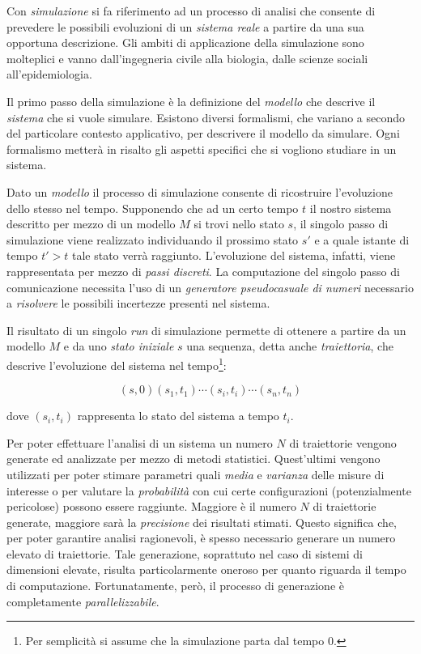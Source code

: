 
Con \emph{simulazione} si fa riferimento ad un processo di analisi che consente di prevedere le possibili evoluzioni di un \emph{sistema reale} a partire da una sua opportuna descrizione. 
%
Gli ambiti di applicazione della simulazione sono molteplici e vanno dall'ingegneria civile alla biologia, dalle scienze sociali all'epidemiologia.

Il primo passo della simulazione \`e la definizione del \emph{modello} che descrive il \emph{sistema} che si vuole simulare.
%
Esistono diversi formalismi, che variano a secondo del particolare contesto applicativo, per descrivere il modello da simulare.
%
Ogni formalismo metter\`a in risalto gli aspetti specifici che si vogliono studiare in un sistema. 

Dato un \emph{modello} il processo di simulazione consente di ricostruire l'evoluzione dello stesso nel tempo. 
%
Supponendo che ad un certo tempo $t$ il nostro sistema descritto per mezzo di un modello $M$ si trovi nello stato $s$, il singolo passo di simulazione viene realizzato individuando il prossimo stato $s'$ e a quale  istante di tempo $t'>t$ tale stato verr\`a raggiunto. 
%
L'evoluzione del sistema, infatti, viene rappresentata per mezzo di \emph{passi discreti}.
%
La computazione del singolo passo di comunicazione necessita l'uso di un \emph{generatore pseudocasuale di numeri} necessario a \emph{risolvere} le possibili incertezze presenti nel sistema.

Il risultato di un singolo \emph{run} di simulazione permette di ottenere a partire da un modello $M$ e da uno \emph{stato iniziale} $s$ una sequenza, detta anche \emph{traiettoria}, che descrive l'evoluzione del sistema nel tempo\footnote{Per semplicit\`a si assume che la simulazione parta dal tempo $0$.}:

\[
(s,0)(s_1,t_1)\cdots (s_i,t_i)\cdots (s_n,t_n)
\]  

\noindent
dove $(s_i,t_i)$ rappresenta lo stato del sistema a tempo $t_i$.

Per poter effettuare l'analisi di un sistema un numero $N$ di traiettorie vengono generate ed analizzate per mezzo di metodi statistici. Quest'ultimi vengono utilizzati per poter stimare parametri quali \emph{media} e \emph{varianza} delle misure di interesse o per valutare la \emph{probabilit\`a} con cui certe configurazioni (potenzialmente pericolose) possono essere raggiunte.
%
Maggiore \`e il numero $N$ di traiettorie generate, maggiore sar\`a la \emph{precisione} dei risultati stimati. 
%
Questo significa che, per poter garantire analisi ragionevoli, \`e spesso necessario generare un numero elevato di traiettorie.
%
Tale generazione, soprattuto nel caso di sistemi di dimensioni elevate, risulta particolarmente oneroso per quanto riguarda il tempo di computazione.
%
Fortunatamente, per\`o, il processo di generazione \`e completamente \emph{parallelizzabile}.

